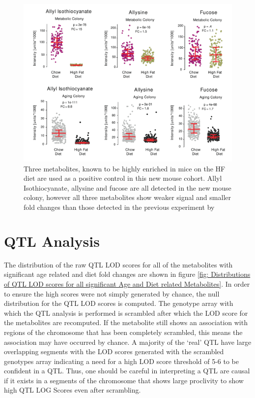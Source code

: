 \documentclass[a4paper]{book}
\begin{document}
\begin{figure}[t!]
		\centering
		\includegraphics[width=0.8\linewidth]{3.Metabolomics/Top_3_Diet_Metabolites}
		\caption{ Three metabolites, known to be highly enriched in mice on the HF diet are used as a positive control in this new mouse cohort. Allyl Isothiocyanate, allysine and fucose are all detected in the new mouse colony, however all three metabolites show weaker signal and smaller fold changes than those detected in the previous experiment by \citeauthor{Williams2016SystemsFunction}}
		\label{fig:Top 3 Diet Metabolites}
\end{figure}
	

\section{QTL Analysis}
	
	The distribution of the raw QTL LOD scores for all of the metabolites with significant age related and diet fold changes are shown in figure \ref{fig: Distributions of QTL LOD scores for all significant Age and Diet related Metabolites}.  In order to ensure the high scores were not simply generated by chance, the null distribution for the QTL LOD scores is computed. The genotype array with which the QTL analysis is performed is scrambled after which the LOD score for the metabolites are recomputed. If the metabolite still shows an association with  regions of the chromosome that has been completely scrambled, this means the association may have occurred by chance. A majority of the ‘real’ QTL have large overlapping segments with the LOD scores generated with the scrambled genotypes array indicating a need for a high LOD score threshold of 5-6 to be confident in a QTL. Thus, one should be careful in interpreting a QTL are causal if it exists in a segments of the chromosome that shows large proclivity to show high QTL LOG Scores even after scrambling. 
	
\end{document}
